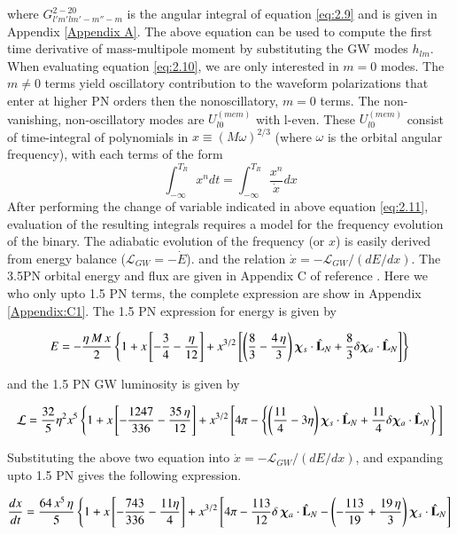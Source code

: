 \documentclass[prd,preprintnumbers,twocolumn,eqsecnum,floatfix,letter]{revtex4}
\begin{document}
where $G^{2-20}_{l'm'lm'-m''-m}$ is the angular integral of equation \ref{eq:2.9} and is given in Appendix \ref{Appendix A}. The above equation can be used to compute the first time derivative of mass-multipole moment by substituting the GW modes $h_{lm}$. When evaluating equation \ref{eq:2.10}, we are only interested in $m=0$ modes. The $m\neq0$ terms yield oscillatory contribution to the waveform polarizations that enter at higher PN orders then the nonoscillatory, $m=0$ terms. The non-vanishing, non-oscillatory modes are $U^{(mem)}_{l0}$ with l-even. These $U^{(mem)}_{l0}$ consist of time-integral of polynomials in $x\equiv(M\omega)^{2/3}$ (where $\omega$ is the orbital angular frequency), with each terms of the form
\begin{equation}\label{eq:2.11}
\int_{-\infty}^{T_{R}} x^{n}dt=\int_{-\infty}^{T_{R}}\frac{x^{n}}{\dot{x}}dx
\end{equation}
After performing the change of variable indicated in above equation \ref{eq:2.11}, evaluation of the resulting integrals requires a model for the frequency evolution of the binary. The adiabatic evolution of the frequency (or $x$) is easily derived from energy balance ($\mathcal{L}_{GW}=-\dot{E}$). and the relation $\dot{x}=-\mathcal{L}_{GW}/(dE/dx)$. The 3.5PN orbital energy and flux are given in Appendix C of reference \cite{Arun2009}. Here we who only upto 1.5 PN terms, the complete expression are show in Appendix \ref{Appendix:C1}. The 1.5 PN expression for energy is given by 
\begin{widetext}
	\begin{align}\label{eq:E}
	E&=-\frac{\eta \, M \, x}{2}\left\{1 + x \left[-\frac{3}{4}-\frac{\eta}{12}\right] + x^{3/2}\left[\left(\frac{8}{3} - \frac{4 \, \eta}{3}\right)\bm{\chi}_s \cdot \hat{\mathbf{L}}_N + \frac{8}{3}\delta\bm{\chi}_a \cdot \hat{\mathbf{L}}_N\right]\right\} \nonumber \\
	\end{align}

and the 1.5 PN GW luminosity is given by

\begin{align}\label{eq:F}
\mathcal{L} &=\frac{32}{5}\eta^2x^5\left\{1 + x\left[-\frac{1247}{336}-\frac{35\,\eta}{12}\right] + x^{3/2}\left[4\pi-\left\{\left(\frac{11}{4}-3\eta\right)\bm{\chi}_s \cdot \hat{\mathbf{L}}_N +\frac{11}{4}\delta\bm{\chi}_a \cdot \hat{\mathbf{L}}_N\right\}\right.\right]\nonumber\\
\end{align}


Substituting the above two equation into $\dot{x}=-\mathcal{L}_{GW}/(dE/dx)$, and expanding upto 1.5 PN gives the following expression.

\begin{align}\label{eq:2.14}
\frac{dx}{dt} & = \frac{64\, x^5  \, \eta}{5} \left\{1 + x \left[-\frac{743}{336}-\frac{11 \eta }{4} \right] 
+ x^{3/2} \left[4 \pi-\frac{113}{12}\delta \, \bm{\chi}_a \cdot \hat{\mathbf{L}}_N- \left(-\frac{113}{19} + \frac{19 \, \eta}{3}  \right)\bm{\chi}_s \cdot \hat{\mathbf{L}}_N \right] \right. \nonumber \\ 
\end{align}
\end{widetext}
\end{document}
